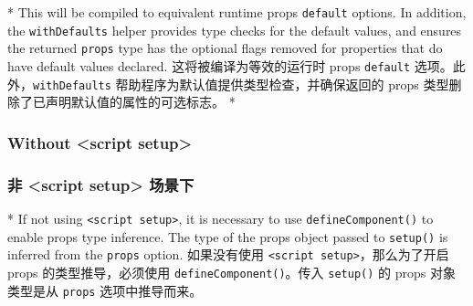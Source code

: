 \begin{paracol}{2} 
 
\switchcolumn[0]*%
This will be compiled to equivalent runtime props \texttt{default}
options. In addition, the \texttt{withDefaults} helper provides type
checks for the default values, and ensures the returned \texttt{props}
type has the optional flags removed for properties that do have default
values declared.
\switchcolumn
这将被编译为等效的运行时 props \texttt{default}
选项。此外，\texttt{withDefaults}
帮助程序为默认值提供类型检查，并确保返回的 props
类型删除了已声明默认值的属性的可选标志。
\switchcolumn[0]*%
\subsubsection{Without \textless script setup\textgreater{}}
\switchcolumn
\subsubsection{非 \textless script setup\textgreater{} 场景下}
\switchcolumn[0]*%
If not using \texttt{\textless{}script\ setup\textgreater{}}, it is
necessary to use \texttt{defineComponent()} to enable props type
inference. The type of the props object passed to \texttt{setup()} is
inferred from the \texttt{props} option.
\switchcolumn
如果没有使用
\texttt{\textless{}script\ setup\textgreater{}}，那么为了开启 props
的类型推导，必须使用 \texttt{defineComponent()}。传入 \texttt{setup()}
的 props 对象类型是从 \texttt{props} 选项中推导而来。
\end{paracol}


